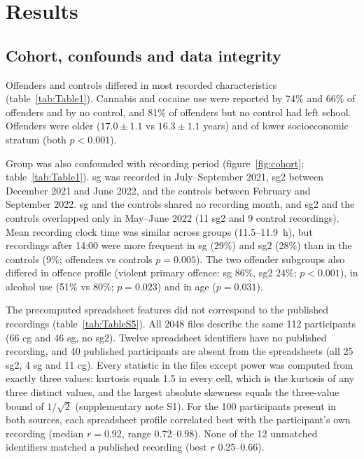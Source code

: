 
\section{Results}
\label{sec:results}

\subsection{Cohort, confounds and data integrity}
\label{sec:res-cohort}

Offenders and controls differed in most recorded characteristics (table~\ref{tab:Table1}). Cannabis and cocaine use were reported by 74\% and 66\% of offenders and by no control, and 81\% of offenders but no control had left school. Offenders were older ($17.0 \pm 1.1$ vs $16.3 \pm 1.1$ years) and of lower socioeconomic stratum (both $p < 0.001$).

Group was also confounded with recording period (figure~\ref{fig:cohort}; table~\ref{tab:Table1}). sg was recorded in July--September 2021, sg2 between December 2021 and June 2022, and the controls between February and September 2022. sg and the controls shared no recording month, and sg2 and the controls overlapped only in May--June 2022 (11 sg2 and 9 control recordings). Mean recording clock time was similar across groups (11.5--11.9~h), but recordings after 14:00 were more frequent in sg (29\%) and sg2 (28\%) than in the controls (9\%; offenders vs controls $p = 0.005$). The two offender subgroups also differed in offence profile (violent primary offence: sg 86\%, sg2 24\%; $p < 0.001$), in alcohol use (51\% vs 80\%; $p = 0.023$) and in age ($p = 0.031$).

The precomputed spreadsheet features did not correspond to the published recordings (table~\ref{tab:TableS5}). All 2048 files describe the same 112 participants (66 cg and 46 sg, no sg2). Twelve spreadsheet identifiers have no published recording, and 40 published participants are absent from the spreadsheets (all 25 sg2, 4 sg and 11 cg). Every statistic in the files except power was computed from exactly three values: kurtosis equals 1.5 in every cell, which is the kurtosis of any three distinct values, and the largest absolute skewness equals the three-value bound of $1/\sqrt{2}$ (supplementary note S1). For the 100 participants present in both sources, each spreadsheet profile correlated best with the participant's own recording (median $r = 0.92$, range 0.72--0.98). None of the 12 unmatched identifiers matched a published recording (best $r$ 0.25--0.66).


